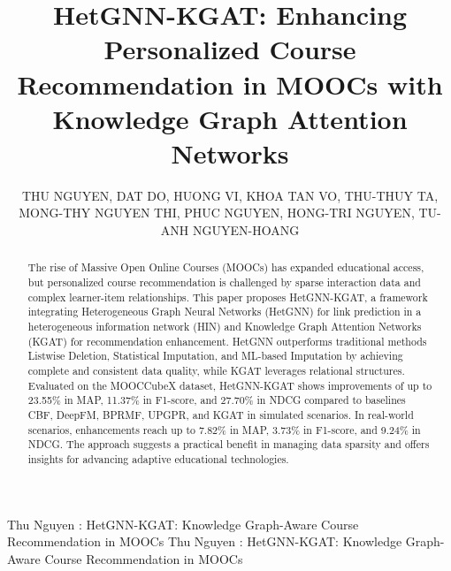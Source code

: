 \documentclass{ieeeaccess}
\begin{document}

\title{HetGNN-KGAT: Enhancing Personalized Course Recommendation in MOOCs with Knowledge Graph Attention Networks}

\author{
\uppercase{Thu Nguyen},
\uppercase{Dat Do},
\uppercase{Huong Vi},
\uppercase{Khoa Tan VO},
\uppercase{Thu-Thuy Ta},
\uppercase{Mong-Thy Nguyen Thi},
\uppercase{Phuc Nguyen},
\uppercase{Hong-Tri Nguyen},
\uppercase{Tu-Anh Nguyen-Hoang}
}

\address[1]{Faculty of Information Science and Engineering, University of Information Technology, Ho Chi Minh City, Vietnam}
\address[2]{Faculty of Information Systems, University of Economics and Law, Ho Chi Minh City, Vietnam}
\address[3]{Vietnam National University, Ho Chi Minh City, Vietnam}
\address[4]{Aalto University, Finland}
\address[*]{These authors contributed equally}

\markboth
{Thu Nguyen  \headeretal: HetGNN-KGAT: Knowledge Graph-Aware Course Recommendation in MOOCs}
{Thu Nguyen  \headeretal: HetGNN-KGAT: Knowledge Graph-Aware Course Recommendation in MOOCs}


\begin{abstract}
The rise of Massive Open Online Courses (MOOCs) has expanded educational access, but personalized course recommendation is challenged by sparse interaction data and complex learner-item relationships. This paper proposes HetGNN-KGAT, a framework integrating Heterogeneous Graph Neural Networks (HetGNN) for link prediction in a heterogeneous information network (HIN) and Knowledge Graph Attention Networks (KGAT) for recommendation enhancement. HetGNN outperforms traditional methods Listwise Deletion, Statistical Imputation, and ML-based Imputation by achieving complete and consistent data quality, while KGAT leverages relational structures. Evaluated on the MOOCCubeX dataset, HetGNN-KGAT shows improvements of up to 23.55\% in MAP, 11.37\% in F1-score, and 27.70\% in NDCG compared to baselines CBF, DeepFM, BPRMF, UPGPR, and KGAT in simulated scenarios. In real-world scenarios, enhancements reach up to 7.82\% in MAP, 3.73\% in F1-score, and 9.24\% in NDCG. The approach suggests a practical benefit in managing data sparsity and offers insights for advancing adaptive educational technologies.
\end{abstract}
\end{document}
